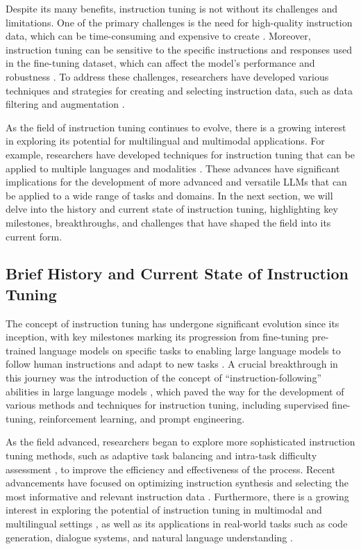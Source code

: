 \documentclass[11pt]{article}
\begin{document}
Despite its many benefits, instruction tuning is not without its challenges and limitations. One of the primary challenges is the need for high-quality instruction data, which can be time-consuming and expensive to create \cite{ref8}. Moreover, instruction tuning can be sensitive to the specific instructions and responses used in the fine-tuning dataset, which can affect the model's performance and robustness \cite{ref3}. To address these challenges, researchers have developed various techniques and strategies for creating and selecting instruction data, such as data filtering and augmentation \cite{ref9}.

As the field of instruction tuning continues to evolve, there is a growing interest in exploring its potential for multilingual and multimodal applications. For example, researchers have developed techniques for instruction tuning that can be applied to multiple languages \cite{ref10} and modalities \cite{ref11}. These advances have significant implications for the development of more advanced and versatile LLMs that can be applied to a wide range of tasks and domains. In the next section, we will delve into the history and current state of instruction tuning, highlighting key milestones, breakthroughs, and challenges that have shaped the field into its current form.

\subsection{Brief History and Current State of Instruction Tuning}

The concept of instruction tuning has undergone significant evolution since its inception, with key milestones marking its progression from fine-tuning pre-trained language models on specific tasks to enabling large language models to follow human instructions and adapt to new tasks \cite{ref12}. A crucial breakthrough in this journey was the introduction of the concept of ``instruction-following'' abilities in large language models \cite{ref13}, which paved the way for the development of various methods and techniques for instruction tuning, including supervised fine-tuning, reinforcement learning, and prompt engineering.

As the field advanced, researchers began to explore more sophisticated instruction tuning methods, such as adaptive task balancing and intra-task difficulty assessment \cite{ref14}, to improve the efficiency and effectiveness of the process. Recent advancements have focused on optimizing instruction synthesis \cite{ref15} and selecting the most informative and relevant instruction data \cite{ref16}. Furthermore, there is a growing interest in exploring the potential of instruction tuning in multimodal and multilingual settings \cite{ref17}, as well as its applications in real-world tasks such as code generation, dialogue systems, and natural language understanding \cite{ref18}.
\end{document}
